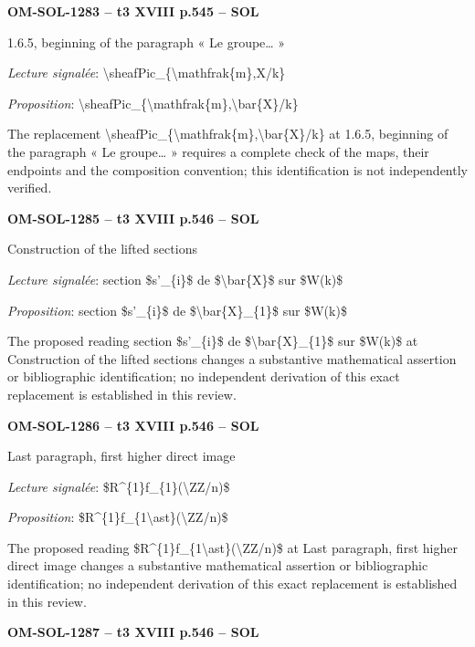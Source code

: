 \par\noindent\textbf{OM-SOL-1283 -- t3 XVIII p.545 -- SOL}\par
1.6.5, beginning of the paragraph « Le groupe… »\par
\emph{Lecture signalée}: \textbackslash{}sheafPic\_\{\textbackslash{}mathfrak\{m\},X/k\}\par
\emph{Proposition}: \textbackslash{}sheafPic\_\{\textbackslash{}mathfrak\{m\},\textbackslash{}bar\{X\}/k\}\par
The replacement \textbackslash{}sheafPic\_\{\textbackslash{}mathfrak\{m\},\textbackslash{}bar\{X\}/k\} at 1.6.5, beginning of the paragraph « Le groupe… » requires a complete check of the maps, their endpoints and the composition convention; this identification is not independently verified.\par
\par\noindent\textbf{OM-SOL-1285 -- t3 XVIII p.546 -- SOL}\par
Construction of the lifted sections\par
\emph{Lecture signalée}: section \$s'\_\{i\}\$ de \$\textbackslash{}bar\{X\}\$ sur \$W(k)\$\par
\emph{Proposition}: section \$s'\_\{i\}\$ de \$\textbackslash{}bar\{X\}\_\{1\}\$ sur \$W(k)\$\par
The proposed reading section \$s'\_\{i\}\$ de \$\textbackslash{}bar\{X\}\_\{1\}\$ sur \$W(k)\$ at Construction of the lifted sections changes a substantive mathematical assertion or bibliographic identification; no independent derivation of this exact replacement is established in this review.\par
\par\noindent\textbf{OM-SOL-1286 -- t3 XVIII p.546 -- SOL}\par
Last paragraph, first higher direct image\par
\emph{Lecture signalée}: \$R\textasciicircum{}\{1\}f\_\{1\}(\textbackslash{}ZZ/n)\$\par
\emph{Proposition}: \$R\textasciicircum{}\{1\}f\_\{1\textbackslash{}ast\}(\textbackslash{}ZZ/n)\$\par
The proposed reading \$R\textasciicircum{}\{1\}f\_\{1\textbackslash{}ast\}(\textbackslash{}ZZ/n)\$ at Last paragraph, first higher direct image changes a substantive mathematical assertion or bibliographic identification; no independent derivation of this exact replacement is established in this review.\par
\par\noindent\textbf{OM-SOL-1287 -- t3 XVIII p.546 -- SOL}\par
